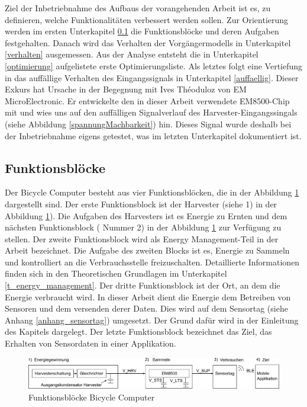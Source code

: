       
Ziel der Inbetriebnahme des Aufbaus der vorangehenden Arbeit \cite{PA_bicycle} ist es, zu definieren, welche Funktionalitäten verbessert werden sollen. Zur Orientierung werden im ersten Unterkapitel \ref{fb} die Funktionsblöcke und deren Aufgaben festgehalten. Danach wird das Verhalten der Vorgängermodells in Unterkapitel \ref{verhalten} ausgemessen. Aus der Analyse entsteht die in Unterkapitel \ref{optimierung} aufgelistete erste Optimierungsliste. Als letztes folgt eine Vertiefung in das auffällige Verhalten des Eingangssignals in Unterkapitel \ref{auffaellig}. Dieser Exkurs hat Ursache in der Begegnung mit  Ives Théoduloz von EM MicroElectronic. Er entwickelte den in dieser Arbeit verwendete EM8500-Chip mit und wies uns auf den auffälligen Signalverlauf des Harvester-Eingangssingals (siehe Abbildung \ref{spannungMachbarkeit}) hin. Dieses Signal wurde deshalb bei der Inbetriebnahme eigens getestet, was im letzten Unterkapitel dokumentiert ist.
      
\subsection{Funktionsblöcke}\label{fb} 

Der Bicycle Computer besteht aus vier Funktionsblöcken, die in der Abbildung \ref{funktionsdiagramm_bild} dargestellt sind. Der erste Funktionsblock ist der Harvester (siehe 1) in der Abbildung \ref{funktionsdiagramm_bild}). Die Aufgaben des Harvesters ist es Energie zu Ernten und dem nächsten Funktionsblock ( Nummer 2) in der Abbildung  \ref{funktionsdiagramm_bild} zur Verfügung zu stellen. Der zweite Funktionsblock wird als Energy Management-Teil in der Arbeit bezeichnet. Die Aufgabe des zweiten Blocks ist es, Energie zu Sammeln und kontrolliert an die Verbrauchsstelle freizuschalten. Detaillierte Informationen finden sich in den Theoretischen Grundlagen im Unterkapitel \ref{t_energy_management}. Der dritte Funktionsblock ist der Ort, an dem die Energie verbraucht wird. In dieser Arbeit dient die Energie dem Betreiben von Sensoren und dem versenden derer Daten. Dies wird auf dem Sensortag (siehe Anhang \ref{anhang_sensortag}) umgesetzt. Der Grund dafür wird in der Einleitung des Kapitels \label{t_power_management} dargelegt. Der letzte Funktionsblock bezeichnet das Ziel, das Erhalten von Sensordaten in einer Applikation.  

\begin{figure}[ht]
   \includegraphics[width=1\textwidth]{3Vorgehen/imag/Blockdiagramm.png}
   \caption{Funktionsblöcke Bicycle Computer}
   \label{funktionsdiagramm_bild} 
\end{figure}

